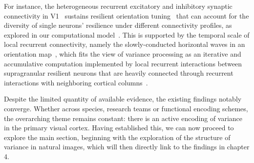 For instance, the heterogeneous recurrent excitatory and inhibitory synaptic connectivity in \gls{V1}~\cite{jia2010dendritic, chen2011functional, iacaruso2017synaptic, scholl2017local} sustains resilient orientation tuning~\cite{monier2003orientation} that can account for the diversity of single neurons' resilience under different connectivity profiles, as explored in our computational model~\cite{ladret2023cortical}.
This is supported by the temporal scale of local recurrent connectivity, namely the slowly-conducted horizontal waves in an orientation map~\cite{chavane2011lateral}, which fits the view of variance processing as an iterative and accumulative computation implemented by local recurrent interactions between supragranular resilient neurons that are heavily connected through recurrent interactions with neighboring cortical columns~\cite{douglas1989canonical,ringach1997dynamics,ringach2002orientation, chavane2011lateral}. 

Despite the limited quantity of available evidence, the existing findings notably converge. Whether across species, research teams or functional encoding schemes, the overarching theme remains constant: there is an active encoding of variance in the primary visual cortex. Having established this, we can now proceed to explore the main section, beginning with the exploration of the structure of variance in natural images, which will then directly link to the findings in chapter 4.